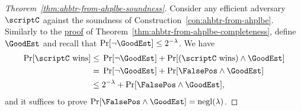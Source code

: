 \begin{proof}
[%
Theorem~\ref{thm:ahbtr-from-ahplbe-soundness}]
Consider any efficient adversary~$\scriptC$ against the soundness of Construction~\ref{con:ahbtr-from-ahplbe}.
Similarly to the \hyperlink{pf:ahbtr-from-ahplbe-completeness}{proof} of Theorem~\ref{thm:ahbtr-from-ahplbe-completeness},
define $\GoodEst$ and recall that ${\Pr[\neg\GoodEst]\leq 2^{-\lambda}}$.
We have
\begin{align*}
\Pr[\scriptC\textup{ wins}]
\leq{}&
\Pr[\neg\GoodEst]
+
\Pr[(\scriptC\textup{ wins})\wedge\GoodEst]
\\{}={}&
\Pr[\neg\GoodEst]
+
\Pr[\FalsePos\wedge\GoodEst]
\\{}\leq{}&
2^{-\lambda}
+
\Pr[\FalsePos\wedge\GoodEst],
\end{align*}
and it suffices to prove ${\Pr[\FalsePos\wedge\GoodEst]=\negl(\lambda)}$.


\end{proof}
